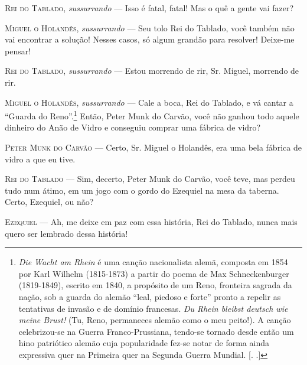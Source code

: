 \begin{myparindent}{0pt}
\begin{Parskip}
\textsc{Rei do Tablado}, \emph{sussurrando} --- Isso é fatal, fatal! Mas o quê a
gente vai fazer?

\textsc{Miguel o Holandês}, \emph{sussurrando} --- Seu tolo Rei do Tablado, você
também não vai encontrar a solução! Nesses casos, só algum grandão para
resolver! Deixe-me pensar!

\textsc{Rei do Tablado}, \emph{sussurrando} --- Estou morrendo de rir, Sr. Miguel,
morrendo de rir.

\textsc{Miguel o Holandês}, \emph{sussurrando} --- Cale a boca, Rei do Tablado, e
vá cantar a ``Guarda do Reno''.\footnote{\emph{Die Wacht am Rhein} é uma
  canção nacionalista alemã, composta em 1854 por Karl Wilhelm
  (1815-1873) a partir do poema de Max Schneckenburger (1819-1849),
  escrito em 1840, a propósito de um Reno, fronteira sagrada da nação,
  sob a guarda do alemão ``leal, piedoso e forte'' pronto a repelir as
  tentativas de invasão e de domínio francesas. \emph{Du Rhein bleibst
  deutsch wie meine Brust!} (Tu, Reno, permaneces alemão como o meu
  peito!). A canção celebrizou-se na Guerra Franco-Prussiana, tendo-se
  tornado desde então um hino patriótico alemão cuja popularidade fez-se
  notar de forma ainda expressiva quer na Primeira quer na Segunda
  Guerra Mundial. [. .]} Então, Peter Munk do Carvão, você não
ganhou todo aquele dinheiro do Anão de Vidro e conseguiu comprar uma
fábrica de vidro?

\textsc{Peter Munk do Carvão} --- Certo, Sr. Miguel o Holandês, era uma bela
fábrica de vidro a que eu tive.

\textsc{Rei do Tablado} --- Sim, decerto, Peter Munk do Carvão, você teve, mas
perdeu tudo num átimo, em um jogo com o gordo do Ezequiel na mesa da
taberna. Certo, Ezequiel, ou não?

\textsc{Ezequiel} --- Ah, me deixe em paz com essa história, Rei do Tablado, nunca
mais quero ser lembrado dessa história!


\end{Parskip}
\end{myparindent}

